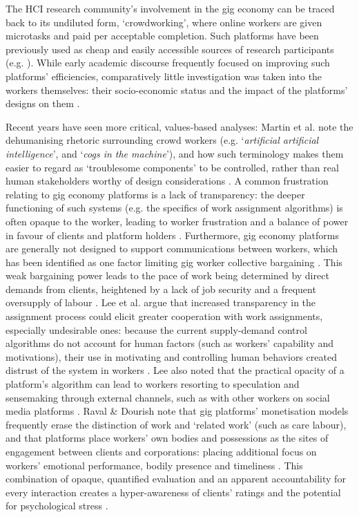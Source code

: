 The HCI research community's involvement in the gig economy can be traced back to its undiluted form, `crowdworking', where online workers are given microtasks and paid per acceptable completion. Such platforms have been previously used as cheap and easily accessible sources of research participants (e.g. \cite{mason2012conducting, mcnaney2016, Othman2017}). While early academic discourse frequently focused on improving such platforms' efficiencies, comparatively little investigation was taken into the workers themselves: their socio-economic status and the impact of the platforms' designs on them \cite{Jacques2019, Irani2013}.

Recent years have seen more critical, values-based analyses: Martin et al. note the dehumanising rhetoric surrounding crowd workers (e.g. `\textit{artificial artificial intelligence}', and `\textit{cogs in the machine}'), and how such terminology makes them easier to regard as `troublesome components' to be controlled, rather than real human stakeholders worthy of design considerations \cite{martin2016}. A common frustration relating to gig economy platforms is a lack of transparency: the deeper functioning of such systems (e.g. the specifics of work assignment algorithms) is often opaque to the worker, leading to worker frustration and a balance of power in favour of clients and platform holders \cite{martin2016}. Furthermore, gig economy platforms are generally not designed to support communications between workers, which has been identified as one factor limiting gig worker collective bargaining \cite{Hara2018}. This weak bargaining power leads to the pace of work being determined by direct demands from clients, heightened by a lack of job security and a frequent oversupply of labour \cite{Wood2019}. Lee et al. argue that increased transparency in the assignment process could elicit greater cooperation with work assignments, especially undesirable ones: because the current supply-demand control algorithms do not account for human factors (such as workers' capability and motivations), their use in motivating and controlling human behaviors created distrust of the system in workers \cite{lee2015}. Lee also noted that the practical opacity of a platform's algorithm can lead to workers resorting to speculation and sensemaking through external channels, such as with other workers on social media platforms \cite{lee2015}. Raval \& Dourish note that gig platforms' monetisation models frequently erase the distinction of work and `related work' (such as care labour), and that platforms place workers' own bodies and possessions as the sites of engagement between clients and corporations: placing additional focus on workers' emotional performance, bodily presence and timeliness \cite{raval2016}. This combination of opaque, quantified evaluation and an apparent accountability for every interaction creates a hyper-awareness of clients' ratings and the potential for psychological stress \cite{lee2015}.

